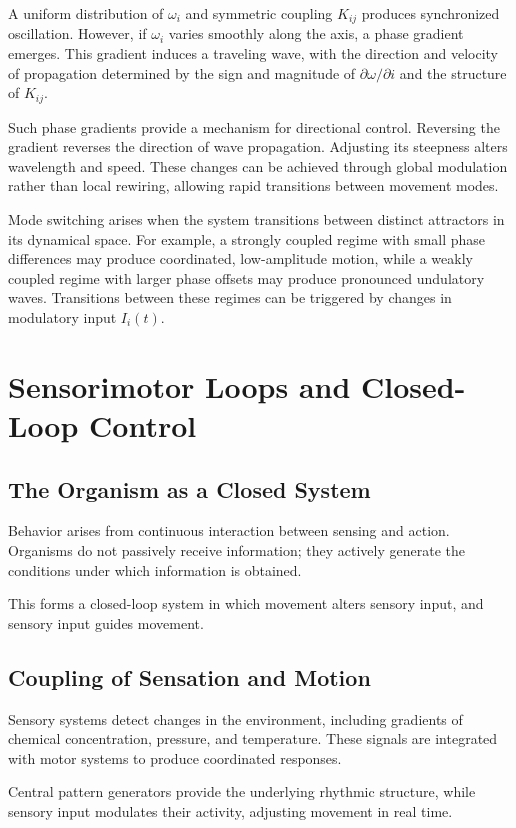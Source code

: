 \documentclass[11pt,oneside]{book}
\begin{document}
A uniform distribution of $\omega_i$ and symmetric coupling $K_{ij}$ produces synchronized oscillation. However, if $\omega_i$ varies smoothly along the axis, a phase gradient emerges. This gradient induces a traveling wave, with the direction and velocity of propagation determined by the sign and magnitude of $\partial \omega / \partial i$ and the structure of $K_{ij}$.

Such phase gradients provide a mechanism for directional control. Reversing the gradient reverses the direction of wave propagation. Adjusting its steepness alters wavelength and speed. These changes can be achieved through global modulation rather than local rewiring, allowing rapid transitions between movement modes.

Mode switching arises when the system transitions between distinct attractors in its dynamical space. For example, a strongly coupled regime with small phase differences may produce coordinated, low-amplitude motion, while a weakly coupled regime with larger phase offsets may produce pronounced undulatory waves. Transitions between these regimes can be triggered by changes in modulatory input $I_i(t)$.

\chapter{Sensorimotor Loops and Closed-Loop Control}

\section{The Organism as a Closed System}

Behavior arises from continuous interaction between sensing and action. Organisms do not passively receive information; they actively generate the conditions under which information is obtained.

This forms a closed-loop system in which movement alters sensory input, and sensory input guides movement.

\section{Coupling of Sensation and Motion}

Sensory systems detect changes in the environment, including gradients of chemical concentration, pressure, and temperature. These signals are integrated with motor systems to produce coordinated responses.

Central pattern generators provide the underlying rhythmic structure, while sensory input modulates their activity, adjusting movement in real time.
\end{document}
